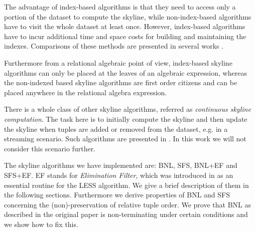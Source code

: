 The advantage of index-based algorithms is that they need to access
only a portion of the dataset to compute the skyline, while
non-index-based algorithms have to visit the whole dataset at least
once.  However, index-based algorithms have to incur additional time
and space costs for building and maintaining the indexes.  Comparisons
of these methods are presented in several works
\citep{Tan2001, Kossmann2002, Chomicki2003}.

Furthermore from a relational algebraic point of view, index-based
skyline algorithms can only be placed at the leaves of an algebraic
expression, whereas the non-indexed based skyline algorithms are first
order citizens and can be placed anywhere in the relational algebra 
expression.

There is a whole class of other skyline algorithms, referred as
\emph{continuous skyline computation}.  
The task here is to initially compute the skyline and then update the
skyline when tuples are added or removed from the dataset, e.g. in a
streaming scenario. 
Such algorithms are presented in \citep{Lin2005, Tao2006}. In this work
we will not consider this scenario further.
 



The skyline algorithms we have implemented are: BNL, SFS, BNL+EF and
SFS+EF. EF stands for {\em Elimination Filter}, which was introduced
in \citep{Godfrey2005} as an essential routine for the LESS algorithm.
We give a brief description of them in the following sections.
Furthermore we derive properties of BNL and SFS concerning the
(non)-preservation of relative tuple order.  We prove that BNL as
described in the original paper is non-terminating under certain
conditions and we show how to fix this.


